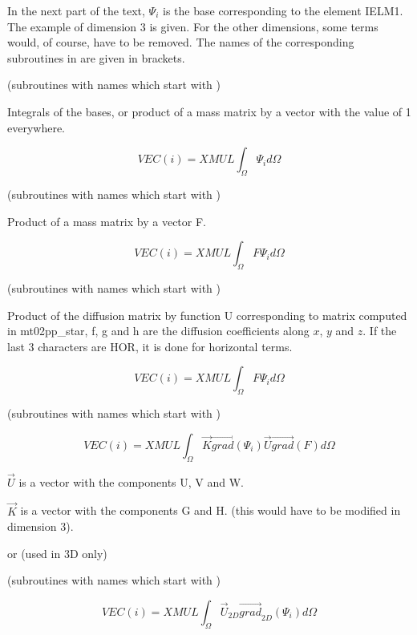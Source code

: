 In the next part of the text, $\Psi _{i} $ is the base corresponding to the
element IELM1. The example of dimension 3 is given. For the other dimensions,
some terms would, of course, have to be removed. The names of the corresponding
subroutines in  are given in brackets.


(subroutines with names which start with )

Integrals of the bases, or product of a mass matrix by a vector with the value
of 1 everywhere.

\[VEC(i)=XMUL \int _{\Omega }\Psi _{i} d\Omega  \]


(subroutines with names which start with )

Product of a mass matrix by a vector F.

\[VEC(i)=XMUL \int _{\Omega }F \Psi _{i} d\Omega  \]


(subroutines with names which start with )

Product of the diffusion matrix by function U corresponding to matrix computed
in mt02pp\_star, f, g and h are the diffusion coefficients along $x$, $y$ and $z$.
If the last 3 characters are HOR, it is done for horizontal terms.

\[VEC(i)=XMUL \int _{\Omega }F \Psi _{i} d\Omega  \]


(subroutines with names which start with )

\[VEC(i)=XMUL
\int _{\Omega }
\vec{K} \overrightarrow{grad} ( \Psi _{i}  )
\vec{U} \overrightarrow{grad} ( F ) d\Omega  \]

$\vec{U}$ is a vector with the components U, V and W.

$\vec{K}$ is a vector with the components G and H. (this would have to be
modified in dimension 3).

   or  
(used in 3D only)

(subroutines with names which start with )

\[VEC(i)=XMUL \int _{\Omega }\vec{U}_{2D}  \overrightarrow{grad} _{2D} ( \Psi _{i}  )  d\Omega  \]

